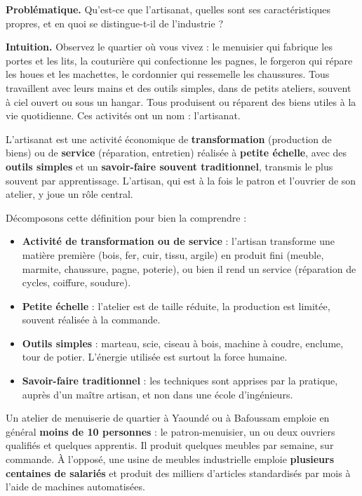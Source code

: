 \documentclass[11pt]{article}
\newcommand{\cle}[1]{{\popxbold\color{popdark}#1}}
\newcounter{popsec}
\newcounter{popsub}
\newcommand{\courssub}[1]{%
  \stepcounter{popsub}%
  \par\vspace{9pt}\noindent{\popxbold\fontsize{11.5}{13}\selectfont\color{popink}{\color{poporange}\thepopsec.\thepopsub}\hspace{6pt}#1}\par\nopagebreak\vspace{4pt}
}
\begin{document}
\textbf{Problématique.} Qu'est-ce que l'artisanat, quelles sont ses caractéristiques propres, et en quoi se distingue-t-il de l'industrie ?

\courssub{Définition de l'artisanat}

\textbf{Intuition.} Observez le quartier où vous vivez : le menuisier qui fabrique les portes et les lits, la couturière qui confectionne les pagnes, le forgeron qui répare les houes et les machettes, le cordonnier qui ressemelle les chaussures. Tous travaillent avec leurs mains et des outils simples, dans de petits ateliers, souvent à ciel ouvert ou sous un hangar. Tous produisent ou réparent des biens utiles à la vie quotidienne. Ces activités ont un nom : l'\cle{artisanat}.

\begin{definition}[L'artisanat]
L'\cle{artisanat} est une activité économique de \textbf{transformation} (production de biens) ou de \textbf{service} (réparation, entretien) réalisée à \textbf{petite échelle}, avec des \textbf{outils simples} et un \textbf{savoir-faire souvent traditionnel}, transmis le plus souvent par apprentissage. L'artisan, qui est à la fois le patron et l'ouvrier de son atelier, y joue un rôle central.
\end{definition}

Décomposons cette définition pour bien la comprendre :
\begin{itemize}
\item \textbf{Activité de transformation ou de service} : l'artisan transforme une matière première (bois, fer, cuir, tissu, argile) en produit fini (meuble, marmite, chaussure, pagne, poterie), ou bien il rend un service (réparation de cycles, coiffure, soudure).
\item \textbf{Petite échelle} : l'atelier est de taille réduite, la production est limitée, souvent réalisée à la commande.
\item \textbf{Outils simples} : marteau, scie, ciseau à bois, machine à coudre, enclume, tour de potier. L'énergie utilisée est surtout la force humaine.
\item \textbf{Savoir-faire traditionnel} : les techniques sont apprises par la pratique, auprès d'un maître artisan, et non dans une école d'ingénieurs.
\end{itemize}

\begin{exemplebox}
Un atelier de menuiserie de quartier à Yaoundé ou à Bafoussam emploie en général \textbf{moins de 10 personnes} : le patron-menuisier, un ou deux ouvriers qualifiés et quelques apprentis. Il produit quelques meubles par semaine, sur commande. À l'opposé, une usine de meubles industrielle emploie \textbf{plusieurs centaines de salariés} et produit des milliers d'articles standardisés par mois à l'aide de machines automatisées.
\end{exemplebox}
\end{document}
